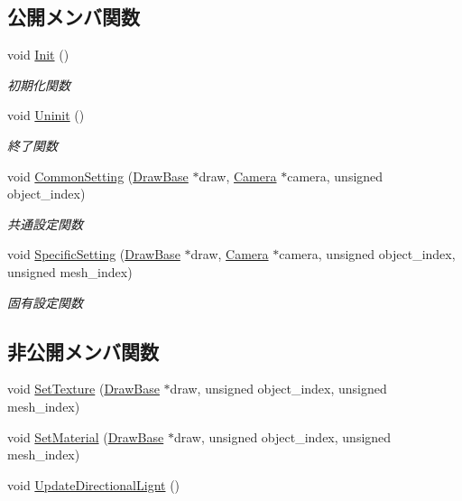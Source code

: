\subsection*{公開メンバ関数}
\begin{DoxyCompactItemize}
\item 
void \mbox{\hyperlink{class_vertex_shader_fixed_ae829ff736b33c45543804059255125b6}{Init}} ()
\begin{DoxyCompactList}\small\item\em 初期化関数 \end{DoxyCompactList}\item 
void \mbox{\hyperlink{class_vertex_shader_fixed_a49f630aee4757c8fd8bae886f22dfeb0}{Uninit}} ()
\begin{DoxyCompactList}\small\item\em 終了関数 \end{DoxyCompactList}\item 
void \mbox{\hyperlink{class_vertex_shader_fixed_a82bf2829b6fd0df26faedcbf650ba08d}{Common\+Setting}} (\mbox{\hyperlink{class_draw_base}{Draw\+Base}} $\ast$draw, \mbox{\hyperlink{class_camera}{Camera}} $\ast$camera, unsigned object\+\_\+index)
\begin{DoxyCompactList}\small\item\em 共通設定関数 \end{DoxyCompactList}\item 
void \mbox{\hyperlink{class_vertex_shader_fixed_a87523c320f6f6767d59d7b24265db7ec}{Specific\+Setting}} (\mbox{\hyperlink{class_draw_base}{Draw\+Base}} $\ast$draw, \mbox{\hyperlink{class_camera}{Camera}} $\ast$camera, unsigned object\+\_\+index, unsigned mesh\+\_\+index)
\begin{DoxyCompactList}\small\item\em 固有設定関数 \end{DoxyCompactList}\end{DoxyCompactItemize}
\subsection*{非公開メンバ関数}
\begin{DoxyCompactItemize}
\item 
void \mbox{\hyperlink{class_vertex_shader_fixed_a1caad0cf4c86788ed17c2a8da8645414}{Set\+Texture}} (\mbox{\hyperlink{class_draw_base}{Draw\+Base}} $\ast$draw, unsigned object\+\_\+index, unsigned mesh\+\_\+index)
\item 
void \mbox{\hyperlink{class_vertex_shader_fixed_a05ce5fdd8ff190b9934497f42cf19a38}{Set\+Material}} (\mbox{\hyperlink{class_draw_base}{Draw\+Base}} $\ast$draw, unsigned object\+\_\+index, unsigned mesh\+\_\+index)
\item 
void \mbox{\hyperlink{class_vertex_shader_fixed_ae15e2c1ce81ca57cf657a6edff36cf9c}{Update\+Directional\+Lignt}} ()
\end{DoxyCompactItemize}

